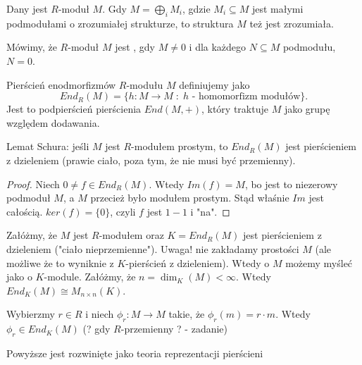 \begin{bbox}
Dany jest $R$-moduł $M$. Gdy $M=\bigoplus_i M_i$, gdzie $M_i\subseteq M$ jest małymi podmodułami o zrozumiałej strukturze, to struktura $M$ też jest zrozumiała.
\end{bbox}

\begin{definition}
Mówimy, że $R$-moduł $M$ jest , gdy $M\neq 0$ i dla każdego $N\subseteq M$ podmodułu, $N=0$.
\end{definition}

Pierścień enodmorfizmów $R$-modułu $M$ definiujemy jako
$$End_R(M)=\{h:M\to M\;:\;h\text{ - homomorfizm modułów}\}.$$
Jest to podpierścień pierścienia $End(M, +)$, który traktuje $M$ jako grupę względem dodawania.

\begin{lemma} Lemat Schura: jeśli $M$ jest $R$-modułem prostym, to $End_R(M)$ jest pierścieniem z dzieleniem (prawie ciało, poza tym, że nie musi być przemienny).
\end{lemma}
\begin{proof}
Niech $0\neq f\in End_R(M)$. Wtedy $Im(f)=M$, bo jest to niezerowy podmoduł $M$, a $M$ przecież było modułem prostym. Stąd właśnie $Im$ jest całością. $ker(f)=\{0\}$, czyli $f$ jest $1-1$ i "na".
\end{proof}

Załóżmy, że $M$ jest $R$-modułem oraz $K=End_R(M)$ jest pierścieniem z dzieleniem ("ciało nieprzemienne"). Uwaga! nie zakładamy prostości $M$ (ale możliwe że to wyniknie z $K$-pierścień z dzieleniem). Wtedy o $M$ możemy myśleć jako o $K$-module. Załóżmy, że $n=\dim_K(M)<\infty$. Wtedy $End_K(M)\cong M_{n\times n}(K)$.

Wybierzmy $r\in R$ i niech $\phi_r:M\to M$ takie, że $\phi_r(m)=r\cdot m$. Wtedy $\phi_r\in End_K(M)$ (? gdy $R$-przemienny ? - zadanie)

\begin{center}\end{center}

Powyższe jest rozwinięte jako teoria reprezentacji pierścieni

\setcounter{section}{11}


